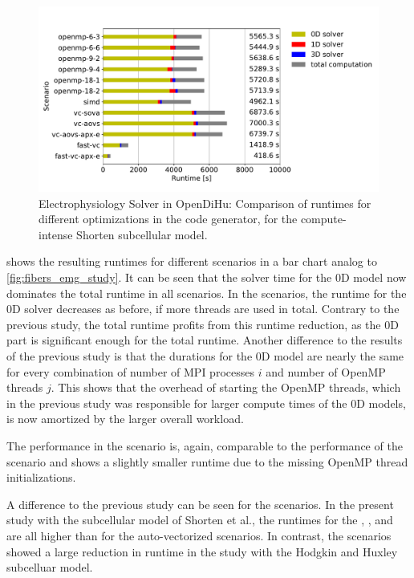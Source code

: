 \begin{figure}
  \centering%
  \includegraphics[width=\textwidth]{images/results/studies/fibers_emg_study_shorten.pdf}%
  \caption{Electrophysiology Solver in OpenDiHu: Comparison of runtimes for different optimizations in the code generator, for the compute-intense Shorten subcellular model.}%
  \label{fig:fibers_emg_study_shorten}%
\end{figure}%

 shows the resulting runtimes for different scenarios in a bar chart analog to \cref{fig:fibers_emg_study}. It can be seen that the solver time for the 0D model now dominates the total runtime in all scenarios. In the  scenarios, the runtime for the 0D solver decreases as before, if more threads are used in total. Contrary to the previous study, the total runtime profits from this runtime reduction, as the 0D part is significant enough for the total runtime. Another difference to the results of the previous study is that the durations for the 0D model are nearly the same for every combination of number of MPI processes $i$ and number of OpenMP threads $j$. This shows that the overhead of starting the OpenMP threads, which in the previous study was responsible for larger compute times of the 0D models, is now amortized by the larger overall workload.

The performance in the  scenario is, again, comparable to the performance of  the  scenario and shows a slightly smaller runtime due to the missing OpenMP thread initializations.

A difference to the previous study can be seen for the  scenarios. In the present study with the subcellular model of Shorten et al., the runtimes for the , , and  are all higher than for the auto-vectorized scenarios. In contrast, the  scenarios showed a large reduction in runtime in the study with the Hodgkin and Huxley subcelluar model. 

